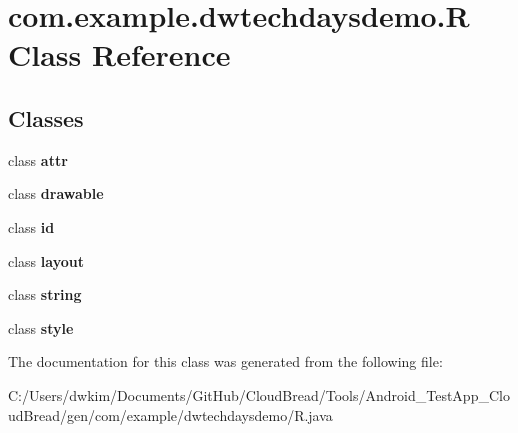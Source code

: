 \hypertarget{classcom_1_1example_1_1dwtechdaysdemo_1_1_r}{}\section{com.\+example.\+dwtechdaysdemo.\+R Class Reference}
\label{classcom_1_1example_1_1dwtechdaysdemo_1_1_r}
\subsection*{Classes}
\begin{DoxyCompactItemize}
\item 
class {\bfseries attr}
\item 
class {\bfseries drawable}
\item 
class {\bfseries id}
\item 
class {\bfseries layout}
\item 
class {\bfseries string}
\item 
class {\bfseries style}
\end{DoxyCompactItemize}


The documentation for this class was generated from the following file\+:\begin{DoxyCompactItemize}
\item 
C\+:/\+Users/dwkim/\+Documents/\+Git\+Hub/\+Cloud\+Bread/\+Tools/\+Android\+\_\+\+Test\+App\+\_\+\+Cloud\+Bread/gen/com/example/dwtechdaysdemo/R.\+java\end{DoxyCompactItemize}
